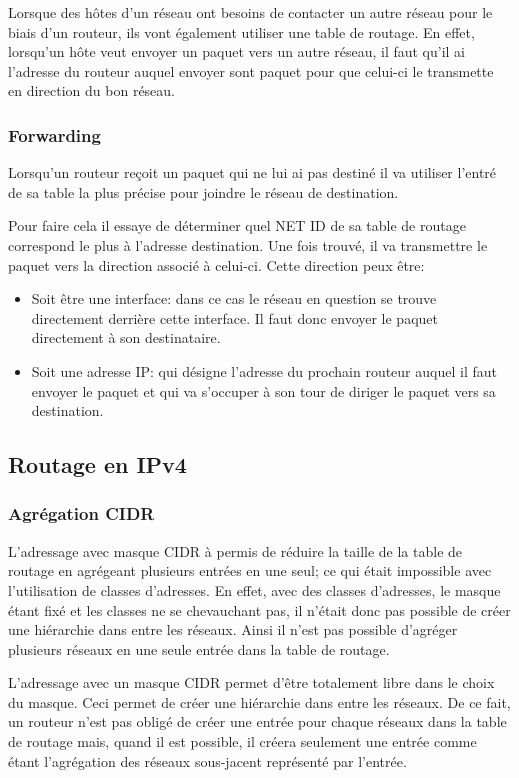 Lorsque des hôtes d'un réseau ont besoins de contacter un autre réseau pour le
biais d'un routeur, ils vont également utiliser une table de routage.  En
effet, lorsqu'un hôte veut envoyer un paquet vers un autre réseau, il faut
qu'il ai l'adresse du routeur auquel envoyer sont paquet pour que celui-ci le
transmette en direction du bon réseau.

\subsubsection{Forwarding}

Lorsqu'un routeur reçoit un paquet qui ne lui ai pas destiné il va utiliser
l'entré de sa table la plus précise pour joindre le réseau de destination.

Pour faire cela il essaye de déterminer quel NET ID de sa table de routage
correspond le plus à l'adresse destination.  Une fois trouvé, il va transmettre
le paquet vers la direction associé à celui-ci.
Cette direction peux être:
\begin{itemize}
\item Soit être une interface: dans ce cas le réseau en question se trouve
directement derrière cette interface. Il faut donc envoyer le paquet
directement à son destinataire.
\item Soit une adresse IP: qui désigne l'adresse du prochain routeur auquel il
faut envoyer le paquet et qui va s'occuper à son tour de diriger le paquet vers
sa destination.
\end{itemize}

\subsection{Routage en IPv4}
\subsubsection{Agrégation CIDR}
L'adressage avec masque CIDR à permis de réduire la taille de la table de
routage en agrégeant plusieurs entrées en une seul; ce qui était impossible avec
l'utilisation de classes d'adresses.  En effet, avec des classes d'adresses, le
masque étant fixé et les classes ne se chevauchant pas, il n'était donc pas
possible de créer une hiérarchie dans entre les réseaux.  Ainsi il n'est pas
possible d'agréger plusieurs réseaux en une seule entrée dans la table de
routage.

L'adressage avec un masque CIDR permet d'être totalement libre dans le choix du
masque. Ceci permet de créer une hiérarchie dans entre les réseaux. De ce fait,
un routeur n'est pas obligé de créer une entrée pour chaque réseaux dans la
table de routage mais, quand il est possible, il créera seulement une entrée
comme étant l'agrégation des réseaux sous-jacent représenté par l'entrée.

